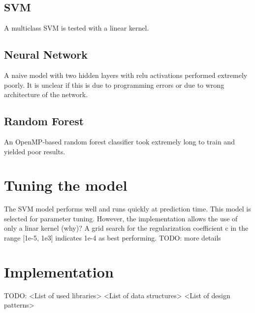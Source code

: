 \documentclass{article}
\begin{document}
\subsection{SVM}
A multiclass SVM is tested with a linear kernel.



\subsection{Neural Network}
A naive model with two hidden layers with relu activations performed extremely poorly.
It is unclear if this is due to programming errors or due to wrong architecture of the network.


\subsection{Random Forest}
An OpenMP-based random forest classifier took extremely long to train and yielded poor results.


\section{Tuning the model}
The SVM model performs well and runs quickly at prediction time.
This model is selected for parameter tuning.
However, the implementation allows the use of only a linar kernel (why)?
A grid search for the regularization coefficient c in the range [1e-5, 1e3] indicates 1e-4 as best performing.
TODO: more details

\section{Implementation}
TODO:
<List of used libraries>
<List of data structures>
<List of design patterns>
\end{document}
